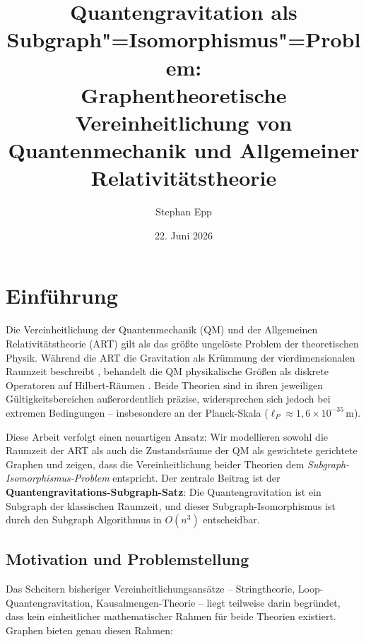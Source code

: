 ﻿\documentclass[a4paper,12pt]{article}
\title{Quantengravitation als Subgraph"=Isomorphismus"=Problem:\\
Graphentheoretische Vereinheitlichung von\\
Quantenmechanik und Allgemeiner Relativit\"atstheorie}
\author{Stephan Epp}
\date{22. Juni 2026}
\theoremstyle{definition}
\begin{document}
\maketitle
\tableofcontents
\newpage

\section{Einf\"uhrung}

Die Vereinheitlichung der Quantenmechanik (QM) und der Allgemeinen
Relativit\"atstheorie (ART) gilt als das gr\"o\ss{}te ungel\"oste Problem
der theoretischen Physik. W\"ahrend die ART die Gravitation als Kr\"ummung
der vierdimensionalen Raumzeit beschreibt \cite{einstein1915}, behandelt die QM
physikalische Gr\"o\ss{}en als diskrete Operatoren auf Hilbert-R\"aumen
\cite{dirac1930}. Beide Theorien sind in ihren jeweiligen G\"ultigkeitsbereichen
au\ss{}erordentlich pr\"azise, widersprechen sich jedoch bei extremen Bedingungen
-- insbesondere an der Planck-Skala ($\ell_P \approx 1{,}6 \times 10^{-35}$\,m).

Diese Arbeit verfolgt einen neuartigen Ansatz: Wir modellieren sowohl die
Raumzeit der ART als auch die Zustandsr\"aume der QM als gewichtete gerichtete
Graphen und zeigen, dass die Vereinheitlichung beider Theorien dem
\emph{Subgraph-Isomorphismus-Problem} entspricht. Der zentrale Beitrag
ist der \textbf{Quantengravitations-Subgraph-Satz}: Die Quantengravitation
ist ein Subgraph der klassischen Raumzeit, und dieser Subgraph-Isomorphismus
ist durch den Subgraph Algorithmus \cite{epp2026subgraph} in $O(n^3)$
entscheidbar.

\subsection{Motivation und Problemstellung}

Das Scheitern bisheriger Vereinheitlichungsans\"atze -- Stringtheorie,
Loop-Quantengravitation, Kausalmengen-Theorie -- liegt teilweise darin
begr\"undet, dass kein einheitlicher mathematischer Rahmen f\"ur beide
Theorien existiert. Graphen bieten genau diesen Rahmen:
\end{document}
